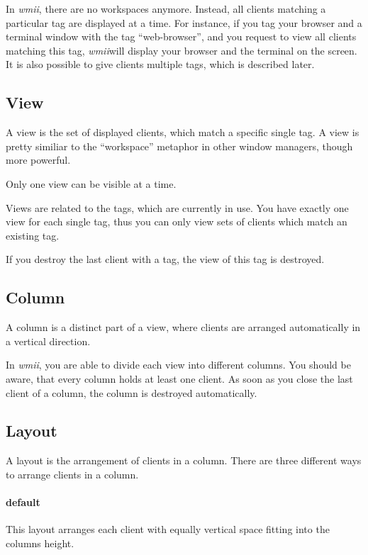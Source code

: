 \documentclass[12pt,a4paper]{article} %
\newcommand{\wmii}{\emph{wmii}}
\begin{document}
    In \wmii, there are no workspaces anymore. Instead, all clients matching a
    particular tag are displayed at a time.  For instance, if you tag your
    browser and a terminal window with the tag ``web-browser'', and you request
    to view all clients matching this tag, \wmii will display your browser
    and the terminal on the screen.
    It is also possible to give clients multiple tags, which is described later.

    \subsection{View}

    A view is the set of displayed clients, which match a specific single tag.
    A view is pretty similiar to the ``workspace'' metaphor in other window
    managers, though more powerful.

    Only one view can be visible at a time.

    Views are related to the tags, which are currently in use. You have exactly
    one view for each single tag, thus you can only view sets of clients which
    match an existing tag.

    If you destroy the last client with a tag, the view of this tag is
    destroyed.

    \subsection{Column}

    A column is a distinct part of a view, where clients are arranged
    automatically in a vertical direction.

    In \wmii, you are able to divide each view into different columns.
    You should be aware, that every column holds at least one client.
    As soon as you close the last client of a column, the column is
    destroyed automatically.


    \subsection{Layout}

    A layout is the arrangement of clients in a column.
    There are three different ways to arrange clients in a column.
    \paragraph{default} This layout arranges each client with
    equally vertical space fitting into the columns height.
\end{document}
